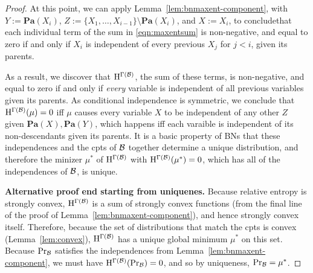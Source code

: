 \documentclass{article}
\def\Pa{\mathbf{Pa}}
\begin{document}
\begin{proof}
	At this point, we can apply Lemma~\ref{lem:bnmaxent-component},
	with $Y := \Pa(X_i)$, $Z := \{X_1, \ldots, X_{i-1}\} \setminus \Pa(X_i)$, and $X := X_i$, to conclude\footnotemark that each individual term of the sum in \eqref{eqn:maxentsum} is non-negative, and equal to zero if and only if $X_i$ is independent of every previous $X_j$ for $j < i$, given its parents. 
	
	
	As a result, we discover that $\mathrm{H}^{\Gamma(\mathcal B)}$, the sum of these terms, is non-negative, and equal to zero if and only if \emph{every} variable is independent of all previous variables given its parents. 
	As conditional independence is symmetric, we conclude that $\mathrm{H}^{\Gamma(\mathcal B)}(\mu) = 0$ iff $\mu$ causes every variable $X$ to be independent of any other $Z$ given $\Pa(X), \Pa(Y)$, which happens iff each varaible is independent of its non-descendants given its parents. It is a basic property of BNs that these independences and the cpts of $\cal B$ together determine a unique distribution, and therefore the minizer $\mu^*$ of $\mathrm{H}^{\Gamma(\mathcal B)}$ with $\mathrm{H}^{\Gamma(\mathcal B)}(\mu^*) = 0$, which has all of the independences of $\cal B$, is unique.
	
	
	\textbf{Alternative proof end starting from uniquenes.}	
	Because relative entropy is strongly convex, $\mathrm{H}^{\Gamma(\mathcal B)}$ is a sum of strongly convex functions (from the final line of the proof of Lemma~\ref{lem:bnmaxent-component}), and hence strongly convex itself. Therefore, because the set of distributions that match the cpts is convex (Lemma~\ref{lem:convex}), $\mathrm{H}^{\Gamma(\mathcal B)}$ has a unique global minimum $\mu^*$ on this set. Because $\Pr_{\cal B}$ satisfies the independences from Lemma~\ref{lem:bnmaxent-component}, we must have $\mathrm{H}^{\Gamma(\mathcal B)}(\Pr_{\cal B}) = 0$, and so by uniqueness, $\Pr_{\cal B} = \mu^*$.
\end{proof}

\clearpage
\end{document}
